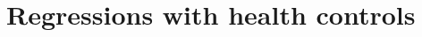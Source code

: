 \documentclass{article}
\begin{document}
\begin{landscape}

\end{landscape}

\begin{landscape}

\end{landscape}

\clearpage

\section{Regressions with health controls}




\end{document}

